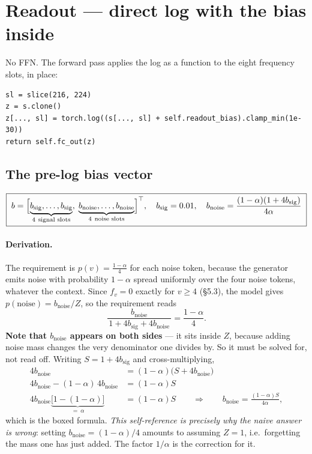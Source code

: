 \documentclass[11pt]{article}
\begin{document}
\section{Readout --- direct log with the bias inside}

No FFN. The forward pass applies the log as a function to the eight frequency slots, in place:
\begin{lstlisting}
sl = slice(216, 224)
z = s.clone()
z[..., sl] = torch.log((s[..., sl] + self.readout_bias).clamp_min(1e-30))
return self.fc_out(z)
\end{lstlisting}

\subsection{The pre-log bias vector}
\begin{equation}
\boxed{\;
b=\Bigl[\underbrace{b_{\mathrm{sig}},\dots,b_{\mathrm{sig}}}_{4\ \text{signal slots}},\;
\underbrace{b_{\mathrm{noise}},\dots,b_{\mathrm{noise}}}_{4\ \text{noise slots}}\Bigr]^\top,
\quad b_{\mathrm{sig}}=0.01,\quad
b_{\mathrm{noise}}=\frac{(1-\alpha)(1+4b_{\mathrm{sig}})}{4\alpha}\;}
\end{equation}

\paragraph{Derivation.} The requirement is $p(v)=\tfrac{1-\alpha}{4}$ for each noise token,
because the generator emits noise with probability $1-\alpha$ spread uniformly over the four noise
tokens, whatever the context. Since $f_v=0$ exactly for $v\ge4$ (\S5.3), the model gives
$p(\mathrm{noise})=b_{\mathrm{noise}}/Z$, so the requirement reads
\begin{equation}
\frac{b_{\mathrm{noise}}}{\,1+4b_{\mathrm{sig}}+4b_{\mathrm{noise}}\,}=\frac{1-\alpha}{4}.
\end{equation}
\textbf{Note that $b_{\mathrm{noise}}$ appears on both sides} --- it sits inside $Z$, because
adding noise mass changes the very denominator one divides by. So it must be solved for, not read
off. Writing $S=1+4b_{\mathrm{sig}}$ and cross-multiplying,
\begin{align}
4b_{\mathrm{noise}}&=(1-\alpha)\bigl(S+4b_{\mathrm{noise}}\bigr)\\
4b_{\mathrm{noise}}-(1-\alpha)\,4b_{\mathrm{noise}}&=(1-\alpha)S\\
4b_{\mathrm{noise}}\underbrace{\bigl[1-(1-\alpha)\bigr]}_{=\ \alpha}&=(1-\alpha)S
\qquad\Longrightarrow\qquad
b_{\mathrm{noise}}=\frac{(1-\alpha)S}{4\alpha},
\end{align}
which is the boxed formula. \emph{This self-reference is precisely why the naive answer is
wrong}: setting $b_{\mathrm{noise}}=(1-\alpha)/4$ amounts to assuming $Z=1$, i.e.\ forgetting the
mass one has just added. The factor $1/\alpha$ is the correction for it.
\end{document}
